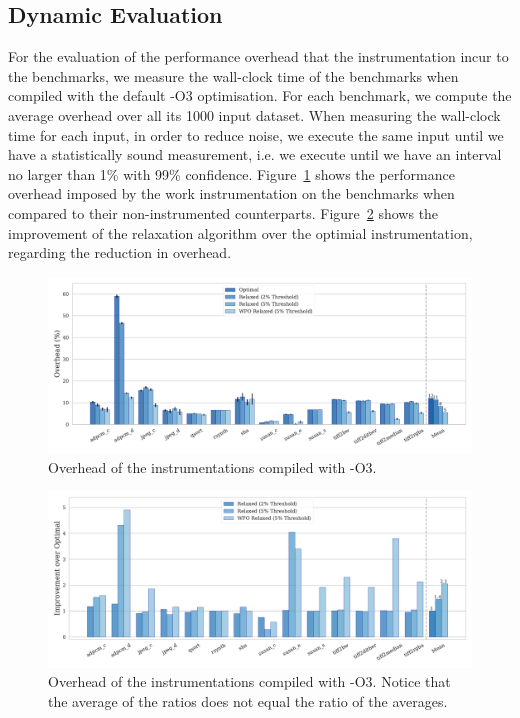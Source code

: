 \subsection{Dynamic Evaluation}

For the evaluation of the performance overhead that the instrumentation incur to the benchmarks, we measure the wall-clock time of the benchmarks when compiled with the default {\flagstype -O3} optimisation.
For each benchmark, we compute the average overhead over all its 1000 input dataset.
When measuring the wall-clock time for each input, in order to reduce noise, we execute the same input until we have a statistically sound measurement, i.e. we execute until we have an interval no larger than 1\% with 99\% confidence.
Figure~\ref{fig:overhead-O3} shows the performance overhead imposed by the work instrumentation on the benchmarks when compared to their non-instrumented counterparts.
Figure~\ref{fig:overhead-improvement-O3} shows the improvement of the relaxation algorithm over the optimial instrumentation, regarding the reduction in overhead.

\begin{figure}[ht]
    \centering
    \includegraphics[width=\textwidth]{figs/overhead-O3.pdf}
    \caption{Overhead of the instrumentations compiled with {\flagstype -O3}.}
    \label{fig:overhead-O3}
\end{figure}

\begin{figure}[ht]
    \centering
    \includegraphics[width=\textwidth]{figs/overhead-improvement-O3.pdf}
    \caption{Overhead of the instrumentations compiled with {\flagstype -O3}.
             Notice that the average of the ratios does not equal the ratio of the averages.}
    \label{fig:overhead-improvement-O3}
\end{figure}

